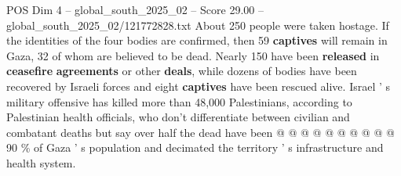 \begin{textsample}{POS Dim 4 – global\_south\_2025\_02 – Score 29.00 – global\_south\_2025\_02/121772828.txt}
About 250 people were taken hostage.
If the identities of the four bodies are confirmed, then 59 \textbf{captives} will remain in Gaza, 32 of whom are believed to be dead.
Nearly 150 have been \textbf{released} in \textbf{ceasefire} \textbf{agreements} or other \textbf{deals}, while dozens of bodies have been recovered by Israeli forces and eight \textbf{captives} have been rescued alive.
Israel ' s military offensive has killed more than 48,000 Palestinians, according to Palestinian health officials, who don't differentiate between civilian and combatant deaths but say over half the dead have been @ @ @ @ @ @ @ @ @ @ 90 \% of Gaza ' s population and decimated the territory ' s infrastructure and health system.

\end{textsample}
